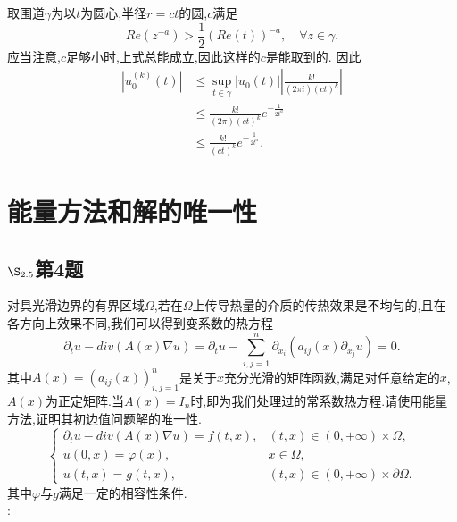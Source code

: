 \documentclass[12pt, a4paper]{ctexbook}
\begin{document}
    取围道$\gamma$为以$t$为圆心,半径$r=ct$的圆,$c$满足
    \begin{equation*}
    Re(z^{-a}) > \frac12 (Re(t))^{-a},\quad \forall z \in \gamma.
    \end{equation*}
    应当注意,$c$足够小时,上式总能成立,因此这样的$c$是能取到的.
    因此
    \begin{align*}
    |u_0^{(k)}(t)|&\le\sup\limits_{t\in \gamma} |u_0(t)|\left|\frac{k!}{(2\pi i)(ct)^k}\right|\\
    &\le \frac{k!}{(2\pi)(ct)^k}e^{-\frac{1}{2t^a}}\\
    &\le \frac{k!}{(ct)^k}e^{-\frac{1}{2t^a}}.
    \end{align*}
    
    
    \section{能量方法和解的唯一性}
    \subsection{$\S_{2.5}$第4题}
    \kaishu{}对具光滑边界的有界区域$\Omega$,若在$\Omega$上传导热量的介质的传热效果是不均匀的,且在各方向上效果不同,我们可以得到变系数的热方程
    \begin{equation*}
    \partial_t u - div(A(x) \nabla u) = \partial_t u - \sum_{i,j=1}^n \partial_{x_i}(a_{ij}(x)\partial_{x_j}u)=0.
    \end{equation*}
    其中$A(x) = (a_{ij}(x))_{i,j=1}^n$是关于$x$充分光滑的矩阵函数,满足对任意给定的$x$,$A(x)$为正定矩阵.当$A(x) =I_n$时,即为我们处理过的常系数热方程.请使用能量方法,证明其初边值问题解的唯一性.
    \begin{equation*}
    \begin{cases}
    \partial_t u - div(A(x) \nabla u) = f(t,x), &(t,x) \in (0,+\infty) \times \Omega,\\
    u(0,x) = \varphi(x),&x \in \Omega,\\
    u(t,x) = g(t,x), &(t,x) \in (0,+\infty) \times \partial \Omega.
    \end{cases}
    \end{equation*}
    其中$\varphi$与$g$满足一定的相容性条件.\\
    
    \songti{}:\\
    
\end{document}

